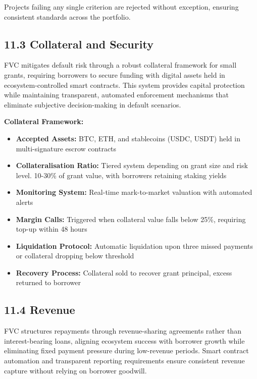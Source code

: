\documentclass[
  paper=a4,
  ,captions=tableheading
]{scrartcl}
\providecommand{\tightlist}{%
  \setlength{\itemsep}{0pt}\setlength{\parskip}{0pt}}
\begin{document}
Projects failing any single criterion are rejected without exception,
ensuring consistent standards across the portfolio.

\subsection{11.3 Collateral and Security}\label{collateral-and-security}

FVC mitigates default risk through a robust collateral framework for
small grants, requiring borrowers to secure funding with digital assets
held in ecosystem-controlled smart contracts. This system provides
capital protection while maintaining transparent, automated enforcement
mechanisms that eliminate subjective decision-making in default
scenarios.

\textbf{Collateral Framework:}

\begin{itemize}
\tightlist
\item
  \textbf{Accepted Assets:} BTC, ETH, and stablecoins (USDC, USDT) held
  in multi-signature escrow contracts
\item
  \textbf{Collateralisation Ratio:} Tiered system depending on grant
  size and risk level. 10-30\% of grant value, with borrowers retaining
  staking yields
\item
  \textbf{Monitoring System:} Real-time mark-to-market valuation with
  automated alerts
\item
  \textbf{Margin Calls:} Triggered when collateral value falls below
  25\%, requiring top-up within 48 hours
\item
  \textbf{Liquidation Protocol:} Automatic liquidation upon three missed
  payments or collateral dropping below threshold
\item
  \textbf{Recovery Process:} Collateral sold to recover grant principal,
  excess returned to borrower
\end{itemize}

\subsection{11.4 Revenue}\label{revenue}

FVC structures repayments through revenue-sharing agreements rather than
interest-bearing loans, aligning ecosystem success with borrower growth
while eliminating fixed payment pressure during low-revenue periods.
Smart contract automation and transparent reporting requirements ensure
consistent revenue capture without relying on borrower goodwill.
\end{document}
